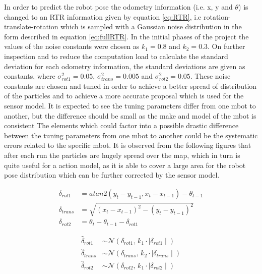 \documentclass[journal,onecolumn]{IEEEtran}
\begin{document}
In order to predict the robot pose the odometry information (i.e. x, y and $\theta$) is changed to an RTR information given by equation \ref{eq:RTR}, i.e rotation-translate-rotation which is sampled with a Gaussian noise distribution in the form described in equation \ref{eq:fullRTR}. In the initial phases of the project the values of the noise constants were chosen as $k_1 = 0.8$ and $k_2 = 0.3$. On further inspection and to reduce the computation load to calculate the standard deviation for each odometry information, the standard deviations are given as constants, where ${\sigma}^2_{rot1} = 0.05$, ${\sigma}^2_{trans} = 0.005$ and ${\sigma}^2_{rot2} = 0.05$. These noise constants are chosen and tuned in order to achieve a better spread of distribution of the particles and to achieve a more accurate proposal which is used for the sensor model. It is expected to see the tuning parameters differ from one mbot to another, but the difference should be small as the make and model of the mbot is consistent The elements which could factor into a possible drastic difference between the tuning parameters from one mbot to another could be the systematic errors related to the specific mbot. It is observed from the following figures that after each run the particles are hugely spread over the map, which in turn is quite useful for a action model, as it is able to cover a large area for the robot pose distribution which can be further corrected by the sensor model. 

\begin{equation}\label{eq:RTR}
\begin{split}
	\delta_{rot1} &= atan2(y_t - y_{t-1}, x_t - x_{t-1}) - \theta_{t-1}	\\
	\delta_{trans} &= \sqrt{(x_t - x_{t-1})^2 - 	(y_t - y_{t-1})^2}	\\
	\delta_{rot2} &= \theta_t - \theta_{t-1} - \delta_{rot1}
\end{split}
\end{equation}

\begin{equation}\label{eq:fullRTR}
\begin{split}
	\hat{\delta}_{rot1} & \sim \mathcal{N}(\delta_{rot1},\,k_1 \cdot \mid\delta_{rot1}\mid)	\\
	\hat{\delta}_{trans} &\sim \mathcal{N}(\delta_{trans},\,k_2 \cdot \mid\delta_{trans}\mid)	\\
	\hat{\delta}_{rot2} &\sim \mathcal{N}(\delta_{rot2},\,k_1 \cdot \mid\delta_{rot2}\mid)
\end{split}
\end{equation}
\end{document}
